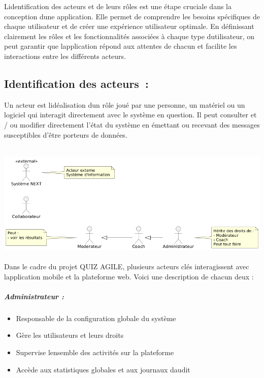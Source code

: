 \documentclass[12pt,a4paper,twoside]{report}
\begin{document}
L\textquotesingle identification des acteurs et de leurs rôles est une
étape cruciale dans la conception d\textquotesingle une application.
Elle permet de comprendre les besoins spécifiques de chaque utilisateur
et de créer une expérience utilisateur optimale. En définissant
clairement les rôles et les fonctionnalités associées à chaque type
d\textquotesingle utilisateur, on peut garantir que
l\textquotesingle application répond aux attentes de chacun et facilite
les interactions entre les différents acteurs.

\hypertarget{identification-des-acteurs}{%
\subsection{Identification des
acteurs~:}\label{identification-des-acteurs}}

Un acteur est l\textquotesingle idéalisation d\textquotesingle un rôle
joué par une personne, un matériel ou un logiciel qui interagit
directement avec le système en question. Il peut consulter et / ou
modifier directement l'état du système en émettant ou recevant des
messages susceptibles d'être porteurs de données.~~

\includegraphics[width=6.3in,height=2.30477in]{latex_media/media/image13.png}Dans
le cadre du projet QUIZ AGILE, plusieurs acteurs clés interagissent avec
l\textquotesingle application mobile et la plateforme web. Voici une
description de chacun d\textquotesingle eux :

\hypertarget{administrateur}{%
\subparagraph{Administrateur :}\label{administrateur}}

\begin{itemize}
\item
  Responsable de la configuration globale du système
\item
  Gère les utilisateurs et leurs droits
\item
  Supervise l\textquotesingle ensemble des activités sur la plateforme
\item
  Accède aux statistiques globales et aux journaux
  d\textquotesingle audit
\end{itemize}
\end{document}
